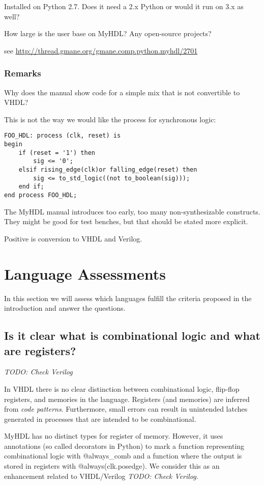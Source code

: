 \documentclass[10pt, conference, compsocconf]{IEEEtran}
\newcommand{\code}[1]{{\small{\textsf{#1}}}}
\newcommand{\todo}[1]{{\emph{TODO: #1}}}
\begin{document}
Installed on Python 2.7. Does it need a 2.x Python or would it run on 3.x as well?

How large is the user base on MyHDL? Any open-source projects?

see \url{http://thread.gmane.org/gmane.comp.python.myhdl/2701}

\subsubsection{Remarks}

Why does the manual show code for a simple mix that is not convertible to VHDL?

This is not the way we would like the process for synchronous logic:

\begin{verbatim}
FOO_HDL: process (clk, reset) is
begin
    if (reset = '1') then
        sig <= '0';
    elsif rising_edge(clk)or falling_edge(reset) then
        sig <= to_std_logic((not to_boolean(sig)));
    end if;
end process FOO_HDL;
\end{verbatim}

The MyHDL manual introduces too early, too many non-synthesizable constructs.
They might be good for test benches, but that should be stated more explicit.

Positive is conversion to VHDL and Verilog.

\section{Language Assessments}

In this section we will assess which languages fulfill the criteria proposed in
the introduction and answer the questions.

\subsection{Is it clear what is combinational logic and what are registers?}

\todo{Check Verilog}

In VHDL there is no clear distinction between combinational logic, flip-flop
registers,  and memories in the language. Registers (and memories) are
inferred from \emph{code patterns}. Furthermore, small errors can result
in unintended latches generated in processes that are intended to be combinational.

MyHDL has no distinct types for register of memory. However, it uses annotations
(so called decorators in Python) to mark a function representing
combinational logic with \code{@always\_comb} and a function where the
output is stored in registers with \code{@always(clk.posedge)}. We consider
this as an enhancement related to VHDL/Verilog \todo{Check Verilog}.
\end{document}
